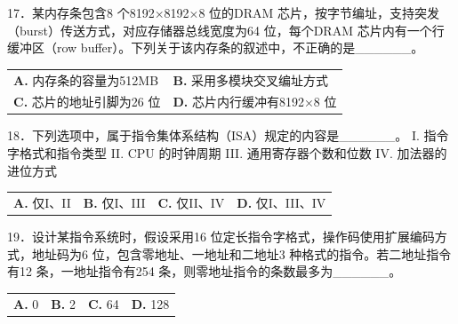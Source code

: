 \documentclass[UTF8,11pt]{ctexart}
\begin{document}
17．某内存条包含8 个8192×8192×8 位的DRAM 芯片，按字节编址，支持突发（burst）传送方式，对应存储器总线宽度为64 位，每个DRAM 芯片内有一个行缓冲区（row buffer）。下列关于该内存条的叙述中，不正确的是\_\_\_\_\_\_。


\begin{center}\begin{tabular}{>{\raggedright\arraybackslash}p{\dimexpr(\linewidth-4\tabcolsep)/2\relax}>{\raggedright\arraybackslash}p{\dimexpr(\linewidth-4\tabcolsep)/2\relax}}
\textbf{A.} 内存条的容量为512MB & \textbf{B.} 采用多模块交叉编址方式\\[.35em]
\textbf{C.} 芯片的地址引脚为26 位 & \textbf{D.} 芯片内行缓冲有8192×8 位\\[.35em]\end{tabular}\end{center}

18．下列选项中，属于指令集体系结构（ISA）规定的内容是\_\_\_\_\_\_。 I. 指令字格式和指令类型 II. CPU 的时钟周期 III. 通用寄存器个数和位数 IV. 加法器的进位方式


\begin{center}\begin{tabular}{>{\raggedright\arraybackslash}p{\dimexpr(\linewidth-8\tabcolsep)/4\relax}>{\raggedright\arraybackslash}p{\dimexpr(\linewidth-8\tabcolsep)/4\relax}>{\raggedright\arraybackslash}p{\dimexpr(\linewidth-8\tabcolsep)/4\relax}>{\raggedright\arraybackslash}p{\dimexpr(\linewidth-8\tabcolsep)/4\relax}}
\textbf{A.} 仅I、II & \textbf{B.} 仅I、III & \textbf{C.} 仅II、IV & \textbf{D.} 仅I、III、IV\\[.35em]\end{tabular}\end{center}

19．设计某指令系统时，假设采用16 位定长指令字格式，操作码使用扩展编码方式，地址码为6 位，包含零地址、一地址和二地址3 种格式的指令。若二地址指令有12 条，一地址指令有254 条，则零地址指令的条数最多为\_\_\_\_\_\_。


\begin{center}\begin{tabular}{>{\raggedright\arraybackslash}p{\dimexpr(\linewidth-8\tabcolsep)/4\relax}>{\raggedright\arraybackslash}p{\dimexpr(\linewidth-8\tabcolsep)/4\relax}>{\raggedright\arraybackslash}p{\dimexpr(\linewidth-8\tabcolsep)/4\relax}>{\raggedright\arraybackslash}p{\dimexpr(\linewidth-8\tabcolsep)/4\relax}}
\textbf{A.} 0 & \textbf{B.} 2 & \textbf{C.} 64 & \textbf{D.} 128\\[.35em]\end{tabular}\end{center}
\end{document}
